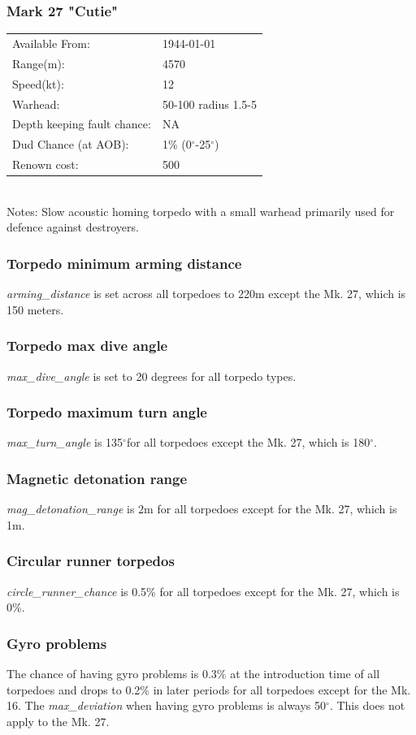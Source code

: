 \documentclass{article}
\newcommand{\degree}{$^{\circ}$}
\begin{document}
\subsubsection{Mark 27 "Cutie"}
\begin{tabular}{l|l}
Available From:& 1944-01-01\\
Range(m):& 4570\\
Speed(kt):&12\\
Warhead:& 50-100 radius 1.5-5\\
Depth keeping fault chance:& NA\\
Dud Chance (at AOB):& 1\% (0\degree-25\degree)\\
Renown cost:& 500\\
\end{tabular} \\
Notes: Slow acoustic homing torpedo with a small warhead primarily used for defence against destroyers.

\subsubsection{Torpedo minimum arming distance}
\emph{arming\_distance} is set across all torpedoes to 220m except the Mk. 27, which is 150 meters.
\subsubsection{Torpedo max dive angle}
\emph{max\_dive\_angle} is set to 20 degrees for all torpedo types.
\subsubsection{Torpedo maximum turn angle}
\emph{max\_turn\_angle} is 135\degree for all torpedoes except the Mk. 27, which is 180\degree.
\subsubsection{Magnetic detonation range}
\emph{mag\_detonation\_range} is 2m for all torpedoes except for the Mk. 27, which is 1m.
\subsubsection{Circular runner torpedos}
\emph{circle\_runner\_chance} is 0.5\% for all torpedoes except for the Mk. 27, which is 0\%.
\subsubsection{Gyro problems}
The chance of having gyro problems is 0.3\% at the introduction time of all torpedoes and drops to 0.2\% in later periods for all torpedoes except for the Mk. 16. The \emph{max\_deviation} when having gyro problems is always 50\degree. This does not apply to the Mk. 27. 
\end{document}
